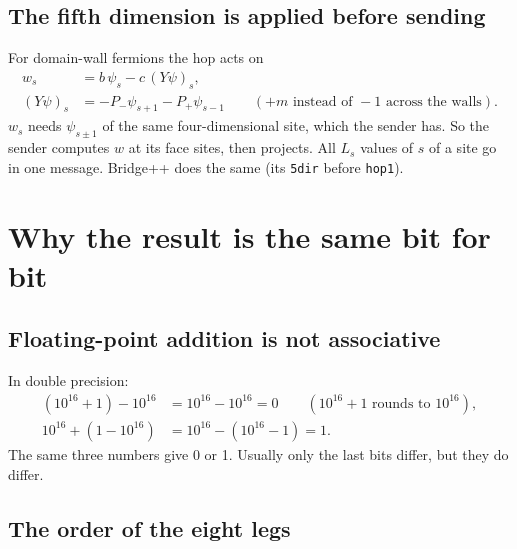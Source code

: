 \documentclass[11pt,a4paper]{article}
\numberwithin{equation}{section}
\newcommand{\code}[1]{\texttt{\small #1}}
\begin{document}
\subsection{The fifth dimension is applied before sending}

For domain-wall fermions the hop acts on
\begin{align}
w_s &= b\,\psi_s - c\,(Y\psi)_s,\\
(Y\psi)_s &= -P_-\psi_{s+1} - P_+\psi_{s-1}\qquad(+m\text{ instead of }-1\text{ across the walls}).
\end{align}
$w_s$ needs $\psi_{s\pm1}$ of the same four-dimensional site, which the sender has. So the sender
computes $w$ at its face sites, then projects. All $L_s$ values of $s$ of a site go in one
message. Bridge++ does the same (its \code{5dir} before \code{hop1}).

\section{Why the result is the same bit for bit}

\subsection{Floating-point addition is not associative}

In double precision:
\begin{align}
(10^{16} + 1) - 10^{16} &= 10^{16} - 10^{16} = 0 \qquad(10^{16}+1\text{ rounds to }10^{16}),\\
10^{16} + (1 - 10^{16}) &= 10^{16} - (10^{16}-1) = 1 .
\end{align}
The same three numbers give 0 or 1. Usually only the last bits differ, but they do differ.

\subsection{The order of the eight legs}
\end{document}
